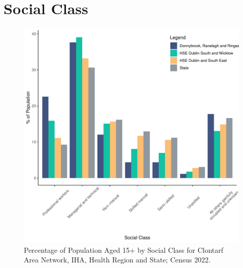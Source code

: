 \documentclass{article}
\begin{document}
\section{Social Class}\label{sect:SC}
\begin{figure}[H]
	\centering
	\includegraphics[width = 140mm]{../figures/SocialClassED.pdf}
	\caption{Percentage of Population Aged 15+ by Social Class for Clontarf Area Network, IHA, Health Region and State; Census 2022.}
	\label{fig:vbnv}
	\end{figure}
\end{document}

